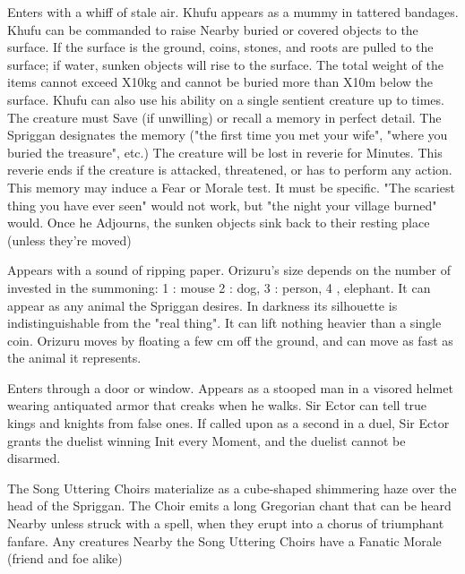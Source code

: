 {
Enters with a whiff of stale air.  Khufu appears as a mummy in tattered bandages.  Khufu can be commanded to raise Nearby buried or covered objects to the surface.  If the surface is the ground, coins, stones, and roots are pulled to the surface; if water, sunken objects will rise to the surface.  The total weight of the items cannot exceed \SUMDICE X10kg and cannot be buried more than \DICE X10m below the surface.  Khufu can also use his ability on a single sentient creature up to \DICE times.  The creature must Save (if unwilling) or recall a memory in perfect detail.  The Spriggan designates the memory ("the first time you met your wife", "where you buried the treasure", etc.)  The creature will be lost in reverie for \SUMDICE Minutes.  This reverie ends if the creature is attacked, threatened, or has to perform any action. This memory may induce a Fear or Morale test. It must be specific. "The scariest thing you have ever seen" would not work, but "the night your village burned" would.  Once he Adjourns, the sunken objects sink back to their resting place (unless they're moved)


Appears with a sound of ripping paper.  Orizuru's size depends on the number of \DICE invested in the summoning: 1 \DICE: mouse 2 \DICE: dog, 3 \DICE: person, 4 \DICE, elephant.  It can appear as any animal the Spriggan desires.  In darkness its silhouette is indistinguishable from the "real thing".   It can lift nothing heavier than a single coin. Orizuru moves by floating a few cm off the ground, and can move as fast as the animal it represents. 


Enters through a door or window.  Appears as a stooped man in a visored helmet wearing antiquated armor that creaks when he walks.  Sir Ector can tell true kings and knights from false ones.  If called upon as a second in a duel, Sir Ector grants the duelist winning Init every Moment, and the duelist cannot be disarmed.



The Song Uttering Choirs materialize as a cube-shaped shimmering haze over the head of the Spriggan.  The Choir emits a long Gregorian chant that can be heard Nearby unless struck with a spell, when they erupt into a chorus of triumphant fanfare.  Any creatures Nearby the Song Uttering Choirs have a Fanatic Morale (friend and foe alike)



}
